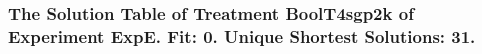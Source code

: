  \begin{frame}
 \fontsize{8pt}{9pt}\selectfont
 \frametitle{ The Solution Table of Treatment BoolT4sgp2k of Experiment ExpE. Fit: 0. Unique Shortest Solutions: 31. }

 \label{ExpESolutionTable000.tex}  
 \end{frame}

